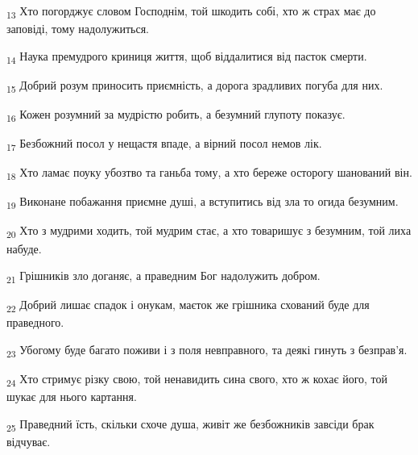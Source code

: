 \begin{tcolorbox}
\textsubscript{13} Хто погорджує словом Господнім, той шкодить собі, хто ж страх має до заповіді, тому надолужиться.
\end{tcolorbox}
\begin{tcolorbox}
\textsubscript{14} Наука премудрого криниця життя, щоб віддалитися від пасток смерти.
\end{tcolorbox}
\begin{tcolorbox}
\textsubscript{15} Добрий розум приносить приємність, а дорога зрадливих погуба для них.
\end{tcolorbox}
\begin{tcolorbox}
\textsubscript{16} Кожен розумний за мудрістю робить, а безумний глупоту показує.
\end{tcolorbox}
\begin{tcolorbox}
\textsubscript{17} Безбожний посол у нещастя впаде, а вірний посол немов лік.
\end{tcolorbox}
\begin{tcolorbox}
\textsubscript{18} Хто ламає поуку убозтво та ганьба тому, а хто береже осторогу шанований він.
\end{tcolorbox}
\begin{tcolorbox}
\textsubscript{19} Виконане побажання приємне душі, а вступитись від зла то огида безумним.
\end{tcolorbox}
\begin{tcolorbox}
\textsubscript{20} Хто з мудрими ходить, той мудрим стає, а хто товаришує з безумним, той лиха набуде.
\end{tcolorbox}
\begin{tcolorbox}
\textsubscript{21} Грішників зло доганяє, а праведним Бог надолужить добром.
\end{tcolorbox}
\begin{tcolorbox}
\textsubscript{22} Добрий лишає спадок і онукам, маєток же грішника схований буде для праведного.
\end{tcolorbox}
\begin{tcolorbox}
\textsubscript{23} Убогому буде багато поживи і з поля невправного, та деякі гинуть з безправ'я.
\end{tcolorbox}
\begin{tcolorbox}
\textsubscript{24} Хто стримує різку свою, той ненавидить сина свого, хто ж кохає його, той шукає для нього картання.
\end{tcolorbox}
\begin{tcolorbox}
\textsubscript{25} Праведний їсть, скільки схоче душа, живіт же безбожників завсіди брак відчуває.
\end{tcolorbox}
